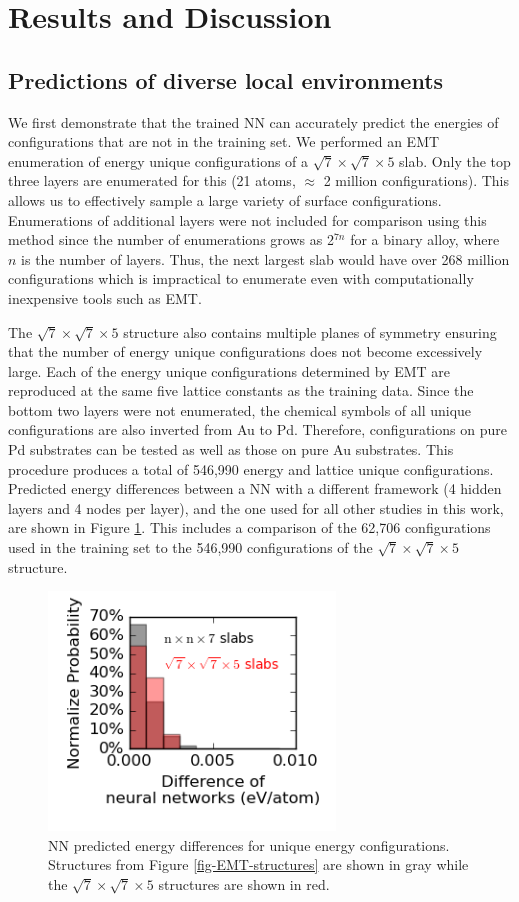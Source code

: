 \documentclass[12pt]{cmuthesis}
\begin{document}
\section{Results and Discussion}
\label{sec:org651fc9a}
\subsection{Predictions of diverse local environments}
\label{sec:org60d4ae9}
We first demonstrate that the trained NN can accurately predict the energies of configurations that are not in the training set.  We performed an EMT enumeration of energy unique configurations of a \(\sqrt{7} \times \sqrt{7} \times 5\) slab. Only the top three layers are enumerated for this (21 atoms, \(\approx\) 2 million configurations). This allows us to effectively sample a large variety of surface configurations. Enumerations of additional layers were not included for comparison using this method since the number of enumerations grows as 2\(^{7n}\) for a binary alloy, where \(n\) is the number of layers. Thus, the next largest slab would have over 268 million configurations which is impractical to enumerate even with computationally inexpensive tools such as EMT.

The \(\sqrt{7} \times \sqrt{7} \times 5\) structure also contains multiple planes of symmetry ensuring that the number of energy unique configurations does not become excessively large. Each of the energy unique configurations determined by EMT are reproduced at the same five lattice constants as the training data. Since the bottom two layers were not enumerated, the chemical symbols of all unique configurations are also inverted from Au to Pd. Therefore, configurations on pure Pd substrates can be tested as well as those on pure Au substrates. This procedure produces a total of 546,990 energy and lattice unique configurations. Predicted energy differences between a NN with a different framework (4 hidden layers and 4 nodes per layer), and the one used for all other studies in this work, are shown in Figure \ref{fig-nn-diff}. This includes a comparison of the 62,706 configurations used in the training set to the 546,990 configurations of the \(\sqrt{7} \times \sqrt{7} \times 5\) structure.

\begin{figure}[h]
\centering
\includegraphics[width=3in]{./images/nn-diff.png}
\caption{\label{fig-nn-diff}
NN predicted energy differences for unique energy configurations. Structures from Figure \ref{fig-EMT-structures} are shown in gray while the \(\sqrt{7} \times \sqrt{7} \times 5\) structures are shown in red.}
\end{figure}
\end{document}
